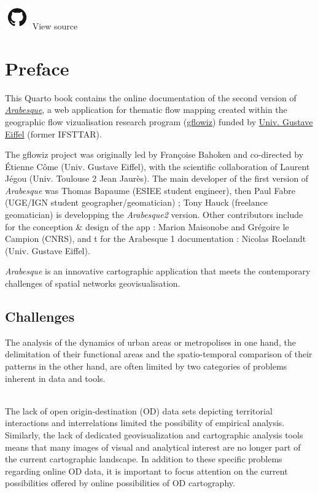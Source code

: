 \documentclass[
  letterpaper,
  DIV=11,
  numbers=noendperiod]{scrreprt}
\begin{document}
\href{https://github.com/gflowiz/arabesque2-doc}{\includegraphics[width=0.41667in,height=\textheight]{images/github.png}}
View source


\chapter{Preface}\label{preface}

This Quarto book contains the online documentation of the second version
of \href{arabesque.univ-eiffel.fr}{\emph{Arabesque}}, a web application
for thematic flow mapping created within the geographic flow
vizualisation research program
(\href{https://geoflowiz.hypotheses.org/accueil/abstract}{gflowiz})
funded by \href{www.univ-eiffel.fr}{Univ. Gustave Eiffel} (former
IFSTTAR).

\hfill\break
The gflowiz project was originally led by Françoise Bahoken and
co-directed by Étienne Côme (Univ. Gustave Eiffel), with the scientific
collaboration of Laurent Jégou (Univ. Toulouse 2 Jean Jaurès). The main
developer of the first version of \emph{Arabesque} was Thomas Bapaume
(ESIEE student engineer), then Paul Fabre (UGE/IGN student
geographer/geomatician) ; Tony Hauck (freelance geomatician) is
developping the \emph{Arabesque2} version. Other contributors include
for the conception \& design of the app : Marion Maisonobe and Grégoire
le Campion (CNRS), and t for the Arabesque 1 documentation : Nicolas
Roelandt (Univ. Gustave Eiffel).

\emph{Arabesque} is an innovative cartographic application that meets
the contemporary challenges of spatial networks geovisualisation.

\section{Challenges}\label{challenges}

The analysis of the dynamics of urban areas or metropolises in one hand,
the delimitation of their functional areas and the spatio-temporal
comparison of their patterns in the other hand, are often limited by two
categories of problems inherent in data and tools.\\
\strut \\
The lack of open origin-destination (OD) data sets depicting territorial
interactions and interrelations limited the possibility of empirical
analysis. Similarly, the lack of dedicated geovisualization and
cartographic analysis tools means that many images of visual and
analytical interest are no longer part of the current cartographic
landscape. In addition to these specific problems regarding online OD
data, it is important to focus attention on the current possibilities
offered by online possibilities of OD cartography.
\end{document}
